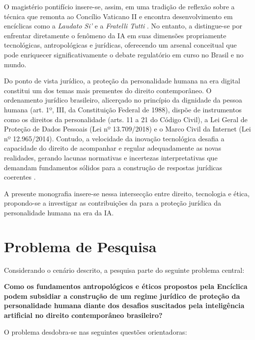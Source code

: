 O magistério pontifício insere-se, assim, em uma tradição de reflexão sobre a técnica que remonta ao Concílio Vaticano II e encontra desenvolvimento em encíclicas como a \textit{Laudato Si'} \cite{Francisco2015LS} e a \textit{Fratelli Tutti} \cite{Francisco2020FT}. No entanto, a \MH{} distingue-se por enfrentar diretamente o fenômeno da IA em suas dimensões propriamente tecnológicas, antropológicas e jurídicas, oferecendo um arsenal conceitual que pode enriquecer significativamente o debate regulatório em curso no Brasil e no mundo.

Do ponto de vista jurídico, a proteção da personalidade humana na era digital constitui um dos temas mais prementes do direito contemporâneo. O ordenamento jurídico brasileiro, alicerçado no princípio da dignidade da pessoa humana (art. 1º, III, da Constituição Federal de 1988), dispõe de instrumentos como os direitos da personalidade (arts. 11 a 21 do Código Civil), a Lei Geral de Proteção de Dados Pessoais (Lei nº 13.709/2018) e o Marco Civil da Internet (Lei nº 12.965/2014). Contudo, a velocidade da inovação tecnológica desafia a capacidade do direito de acompanhar e regular adequadamente as novas realidades, gerando lacunas normativas e incertezas interpretativas que demandam fundamentos sólidos para a construção de respostas jurídicas coerentes \cite{MendesDoneda2021PD, Frazao2020RD}.

A presente monografia insere-se nessa intersecção entre direito, tecnologia e ética, propondo-se a investigar as contribuições da \MH{} para a proteção jurídica da personalidade humana na era da IA.

\section{Problema de Pesquisa}
\label{sec:problema}

Considerando o cenário descrito, a pesquisa parte do seguinte problema central:

\begin{citacao}
\textbf{Como os fundamentos antropológicos e éticos propostos pela Encíclica \MH{} podem subsidiar a construção de um regime jurídico de proteção da personalidade humana diante dos desafios suscitados pela inteligência artificial no direito contemporâneo brasileiro?}
\end{citacao}

O problema desdobra-se nas seguintes questões orientadoras:

